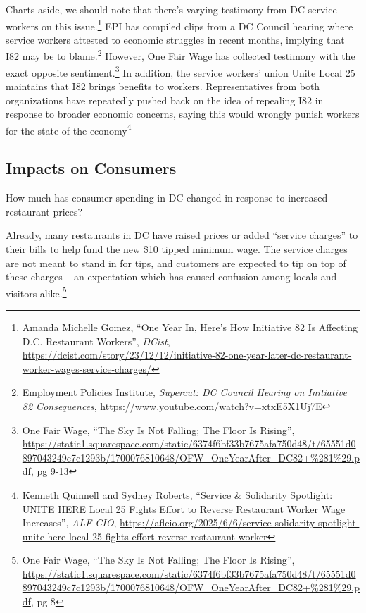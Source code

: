 \documentclass[
  14pt,
]{article}
\begin{document}
Charts aside, we should note that there's varying testimony from DC
service workers on this issue.\footnote{Amanda Michelle Gomez, ``One
  Year In, Here's How Initiative 82 Is Affecting D.C. Restaurant
  Workers'', \emph{DCist},
  \url{https://dcist.com/story/23/12/12/initiative-82-one-year-later-dc-restaurant-worker-wages-service-charges/}}
EPI has compiled clips from a DC Council hearing where service workers
attested to economic struggles in recent months, implying that I82 may
be to blame.\footnote{Employment Policies Institute, \emph{Supercut: DC
  Council Hearing on Initiative 82 Consequences},
  \url{https://www.youtube.com/watch?v=xtxE5X1Uj7E}} However, One Fair
Wage has collected testimony with the exact opposite
sentiment.\footnote{One Fair Wage, ``The Sky Is Not Falling; The Floor
  Is Rising'',
  \url{https://static1.squarespace.com/static/6374f6bf33b7675afa750d48/t/65551d0897043249c7c1293b/1700076810648/OFW_OneYearAfter_DC82+\%281\%29.pdf},
  pg 9-13} In addition, the service workers' union Unite Local 25
maintains that I82 brings benefits to workers. Representatives from both
organizations have repeatedly pushed back on the idea of repealing I82
in response to broader economic concerns, saying this would wrongly
punish workers for the state of the economy\footnote{Kenneth Quinnell
  and Sydney Roberts, ``Service \& Solidarity Spotlight: UNITE HERE
  Local 25 Fights Effort to Reverse Restaurant Worker Wage Increases'',
  \emph{ALF-CIO},
  \url{https://aflcio.org/2025/6/6/service-solidarity-spotlight-unite-here-local-25-fights-effort-reverse-restaurant-worker}}

\subsection{Impacts on Consumers}\label{impacts-on-consumers}

How much has consumer spending in DC changed in response to increased
restaurant prices?

Already, many restaurants in DC have raised prices or added ``service
charges'' to their bills to help fund the new \$10 tipped minimum wage.
The service charges are not meant to stand in for tips, and customers
are expected to tip on top of these charges -- an expectation which has
caused confusion among locals and visitors alike.\footnote{One Fair
  Wage, ``The Sky Is Not Falling; The Floor Is Rising'',
  \url{https://static1.squarespace.com/static/6374f6bf33b7675afa750d48/t/65551d0897043249c7c1293b/1700076810648/OFW_OneYearAfter_DC82+\%281\%29.pdf},
  pg 8}
\end{document}
